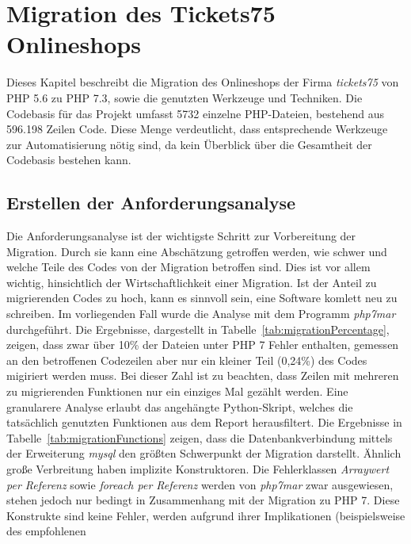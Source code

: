 \chapter{Migration des Tickets75 Onlineshops}\label{ch:migration} 

Dieses Kapitel beschreibt die Migration des Onlineshops der Firma \textit{tickets75} von \ac{PHP} 5.6 zu \ac{PHP} 7.3, sowie die 
genutzten Werkzeuge und Techniken. Die Codebasis 
für das Projekt umfasst 5732 einzelne \ac{PHP}-Dateien, bestehend aus 596.198 Zeilen Code. Diese Menge verdeutlicht, dass 
entsprechende Werkzeuge zur Automatisierung nötig sind, da kein Überblick über die Gesamtheit der Codebasis bestehen kann.

\section{Erstellen der Anforderungsanalyse}\label{analyze}
Die Anforderungsanalyse ist der wichtigste Schritt zur Vorbereitung der Migration. Durch sie kann eine Abschätzung getroffen werden, 
wie schwer und welche Teile des Codes von der Migration betroffen sind. Dies ist vor allem wichtig, hinsichtlich der 
Wirtschaftlichkeit einer Migration. Ist der Anteil zu migrierenden Codes zu hoch, kann es sinnvoll sein, eine Software 
komlett neu zu schreiben. Im vorliegenden Fall wurde die Analyse mit dem Programm \textit{php7mar} durchgeführt.
Die Ergebnisse, dargestellt in Tabelle~\ref{tab:migrationPercentage}, zeigen, dass zwar über 10\% der Dateien unter \ac{PHP} 7 
Fehler enthalten, gemessen an den betroffenen Codezeilen aber nur ein kleiner Teil (0,24\%) des Codes migiriert werden muss.
Bei dieser Zahl ist zu beachten, dass Zeilen mit mehreren zu migrierenden Funktionen nur ein einziges Mal gezählt werden. %
Eine granularere Analyse erlaubt das angehängte Python-Skript, welches die tatsächlich genutzten Funktionen aus dem Report 
herausfiltert. Die Ergebnisse in Tabelle~\ref{tab:migrationFunctions} zeigen, dass die Datenbankverbindung mittels der 
Erweiterung \textit{mysql} den größten Schwerpunkt der Migration darstellt. Ähnlich große Verbreitung haben implizite 
Konstruktoren. Die Fehlerklassen \textit{Arraywert per Referenz} sowie \textit{foreach per Referenz} werden von \textit{php7mar} zwar ausgewiesen, stehen jedoch 
nur bedingt in Zusammenhang mit der Migration zu \ac{PHP} 7. Diese Konstrukte sind keine Fehler, werden aufgrund ihrer Implikationen (beispielsweise des empfohlenen 
